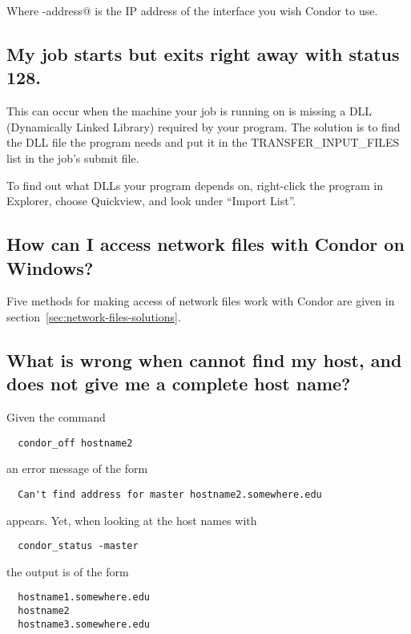 Where \verb@ip-address@ is the IP address of the interface you wish
Condor to use.

\subsection*{My job starts but exits right away with status 128.}

This can occur when the machine your job is running on is missing a
DLL (Dynamically Linked Library) required by your program.
The solution is to find the DLL file the program needs and put it in
the TRANSFER\_INPUT\_FILES list in the job's submit file.

To find out what DLLs your program depends on, right-click the program
in Explorer, choose Quickview, and look under ``Import List''.


\subsection*{How can I access network files with Condor on Windows?}

Five methods for making access of network files work with Condor
are given in 
section~\ref{sec:network-files-solutions}.

\subsection*{What is wrong when  cannot find my host, and  does not give me a complete host name?}

Given the command
\begin{verbatim}
  condor_off hostname2
\end{verbatim}
an error message of the form
\begin{verbatim}
  Can't find address for master hostname2.somewhere.edu
\end{verbatim}
appears.
Yet, when looking at the host names with
\begin{verbatim}
  condor_status -master
\end{verbatim}
the output is of the form 
\begin{verbatim}
  hostname1.somewhere.edu
  hostname2
  hostname3.somewhere.edu
\end{verbatim}

